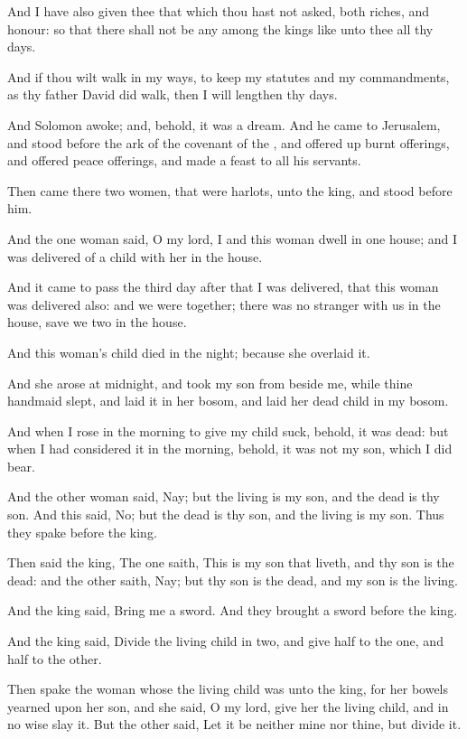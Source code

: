 \verse And I have also given thee that which thou hast not asked, both riches, and honour: so that there shall not be any among the kings like unto thee all thy days.

\verse And if thou wilt walk in my ways, to keep my statutes and my commandments, as thy father David did walk, then I will lengthen thy days.

\verse And Solomon awoke; and, behold, it was a dream. And he came to Jerusalem, and stood before the ark of the covenant of the \LORD, and offered up burnt offerings, and offered peace offerings, and made a feast to all his servants.

\verse Then came there two women, that were harlots, unto the king, and stood before him.

\verse And the one woman said, O my lord, I and this woman dwell in one house; and I was delivered of a child with her in the house.

\verse And it came to pass the third day after that I was delivered, that this woman was delivered also: and we were together; there was no stranger with us in the house, save we two in the house.

\verse And this woman's child died in the night; because she overlaid it.

\verse And she arose at midnight, and took my son from beside me, while thine handmaid slept, and laid it in her bosom, and laid her dead child in my bosom.

\verse And when I rose in the morning to give my child suck, behold, it was dead: but when I had considered it in the morning, behold, it was not my son, which I did bear.

\verse And the other woman said, Nay; but the living is my son, and the dead is thy son. And this said, No; but the dead is thy son, and the living is my son. Thus they spake before the king.

\verse Then said the king, The one saith, This is my son that liveth, and thy son is the dead: and the other saith, Nay; but thy son is the dead, and my son is the living.

\verse And the king said, Bring me a sword. And they brought a sword before the king.

\verse And the king said, Divide the living child in two, and give half to the one, and half to the other.

\verse Then spake the woman whose the living child was unto the king, for her bowels yearned upon her son, and she said, O my lord, give her the living child, and in no wise slay it. But the other said, Let it be neither mine nor thine, but divide it.

